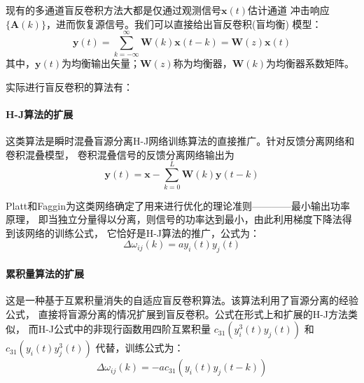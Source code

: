 	现有的多通道盲反卷积方法大都是仅通过观测信号$\bm{x}(t)$估计通道
冲击响应$\{\bm{A}(k)\}$，进而恢复源信号。我们可以直接给出盲反卷积(盲均衡)
模型：
\begin{equation}
\bm{y}(t) = \sum^\infty_{k=-\infty}\bm{W}(k)\bm{x}(t-k)=\bm{W}(z)\bm{x}(t)
\end{equation}
其中，$\bm{y}(t)$为均衡输出矢量；$\bm{W}(z)$称为均衡器，$\bm{W}(k)$为均衡器系数矩阵。

实际进行盲反卷积的算法有：
\paragraph*{H-J算法的扩展}
这类算法是瞬时混叠盲源分离H-J网络训练算法的直接推广。针对反馈分离网络和卷积混叠模型，
卷积混叠信号的反馈分离网络输出为
\begin{equation}
\bm{y}(t)=\bm{x}-\sum^{L}_{k=0}\bm{W}(k)\bm{y}(t-k)
\end{equation}

Platt和Faggin为这类网络确定了用来进行优化的理论准则————最小输出功率原理，
即当独立分量得以分离，则信号的功率达到最小，由此利用梯度下降法得到该网络的训练公式，
它恰好是H-J算法的推广，公式为：
\begin{equation}
\Delta\omega_{ij}(k)=a y_i(t)y_j(t)
\end{equation}

\paragraph*{累积量算法的扩展}
这是一种基于互累积量消失的自适应盲反卷积算法。该算法利用了盲源分离的经验公式，
直接将盲源分离的情况扩展到盲反卷积。公式在形式上和扩展的H-J方法类似，
而H-J公式中的非现行函数用四阶互累积量
$c_{31}(y_i^3(t)y_j(t))$ 和 $c_{31}(y_i(t)y_j^3(t))$
代替，训练公式为：
\begin{equation}
\Delta\omega_{ij}(k)=-ac_{31}(y_i(t)y_j(t-k))
\end{equation}
